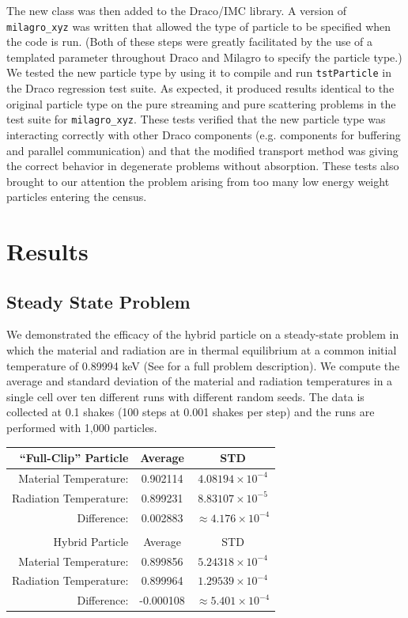 \documentclass[11pt]{nmemo}
\begin{document}
The new class was then added to the Draco/IMC library. A version of
\texttt{milagro\_xyz} was written that allowed the type of particle to
be specified when the code is run. (Both of these steps were greatly
facilitated by the use of a templated parameter throughout Draco and
Milagro to specify the particle type.) We tested the new particle type
by using it to compile and run \texttt{tstParticle} in the Draco
regression test suite. As expected, it produced results identical to
the original particle type on the pure streaming and pure scattering
problems in the test suite for \texttt{milagro\_xyz}. These tests
verified that the new particle type was interacting correctly with
other Draco components (e.g. components for buffering and parallel
communication) and that the modified transport method was giving the
correct behavior in degenerate problems without absorption. These
tests also brought to our attention the problem arising from too many
low energy weight particles entering the census.

\section{Results}

\subsection{Steady State Problem}

We demonstrated the efficacy of the hybrid particle on a steady-state
problem in which the material and radiation are in thermal equilibrium
at a common initial temperature of 0.89994 keV (See \cite{x-6:rn99037}
for a full problem description). We compute the average and standard
deviation of the material and radiation temperatures in a single cell
over ten different runs with different random seeds. The data is
collected at 0.1 shakes (100 steps at 0.001 shakes per step) and the
runs are performed with 1,000 particles.

\begin{center}
  \begin{tabular}{r|cc}
    ``Full-Clip'' Particle  &  Average   & STD \\ \hline
     Material Temperature:  &  0.902114  & $4.08194\times 10^{-4}$ \\
     Radiation Temperature: &  0.899231  & $8.83107\times 10^{-5}$ \\
     Difference:            &  0.002883  & $\approx 4.176\times 10^{-4}$\\
     \multicolumn{3}{c}{} \\
     Hybrid Particle        &  Average   & STD \\ \hline
     Material Temperature:  &  0.899856  & $5.24318\times 10^{-4}$ \\
     Radiation Temperature: &  0.899964  & $1.29539\times 10^{-4}$ \\
     Difference:            & -0.000108  & $\approx 5.401\times 10^{-4}$\\
  \end{tabular}
\end{center}
\end{document}

